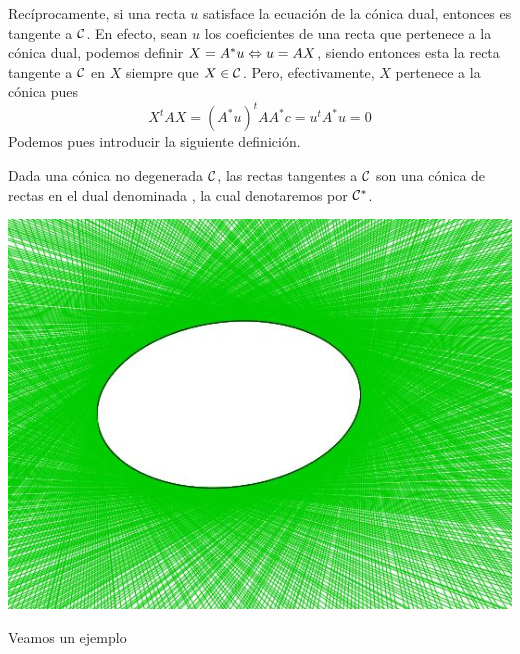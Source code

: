 Recíprocamente, si una recta $u$ satisface la ecuación de la cónica dual, entonces es tangente a $\mathcal{C}$. En efecto, sean $u$ los coeficientes de una recta que pertenece a la cónica dual, podemos definir $X=A^*u\Leftrightarrow u=AX$, siendo entonces esta la recta tangente a $\mathcal{C}$ en $X$ siempre que $X\in \mathcal{C}$. Pero, efectivamente, $X$ pertenece a la cónica pues
\[X^tAX=(A^*u)^tAA^*c=u^tA^*u=0\] 
Podemos pues introducir la siguiente definición.
\begin{defi}
	Dada una cónica no degenerada $\mathcal{C}$, las rectas tangentes a $\mathcal{C}$ son una cónica de rectas en el dual denominada , la cual denotaremos por $\mathcal{C}^*$.
\end{defi}
\begin{center}
	\includegraphics[scale=.45]{Graficos/Conicas/ConicaDual.JPG}
\end{center}
Veamos un ejemplo
